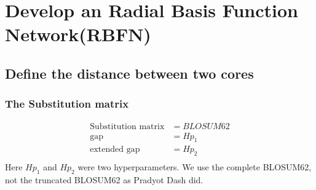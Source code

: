 \documentclass[hyperref={pdfpagelabels=false}]{beamer}
\begin{document}
%
%
%
%
%




\section{Develop an Radial Basis Function Network(RBFN)} 
\subsection{Define the distance between two cores}
\begin{frame}
\frametitle{The Substitution matrix}
\vspace{-1cm}
 		\begin{align*}
			\text{Substitution matrix} &= BLOSUM62\\
			\text{gap} &= Hp_1\\
			\text{extended gap} &= Hp_2\\
		\end{align*}
	Here $Hp_1$ and $Hp_2$ were two hyperparameters. We use the complete BLOSUM62, not the truncated BLOSUM62 as Pradyot Dash did. 
\end{frame}
\end{document}

